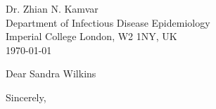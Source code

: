 


\clearpage
\begin{flushright}
  Dr. Zhian N. Kamvar\\
  Department of Infectious Disease Epidemiology\\
  Imperial College London, W2 1NY, UK\\
  \today
\end{flushright}
\date{\today} %
\opening{Dear Sandra Wilkins} %
\closing{Sincerely,} %







